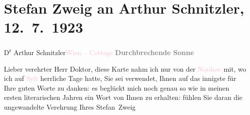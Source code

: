 

\renewcommand{\erwaehntePersonen}{Personen: Stefan Zweig}
\renewcommand{\erwaehnteOrte}{Orte: Nordsee, Salzburg, Sternwartestraße 71, Sylt, Wien, Währinger Cottage}
\renewcommand{\erwaehnteWerke}{}
\section[Stefan Zweig an Arthur Schnitzler, 12. 7. 1923]{Stefan Zweig an Arthur Schnitzler, 12. 7. 1923}
\nopagebreak{}
\rehead{ }\normalsize\beginnumbering{}
\toendnotes[C]{\smallbreak\pagebreak[2]}
\toendnotes[C]{\smallbreak}\pstart{}{\pb}D\textsuperscript{r}
                  Arthur Schnitzler\pend{}\pstart{}\textcolor{pink}{Wien – Cottage}{}\ledrightnote{\textcolor{pink}{Währinger Cottage}}\pend{}\pstart{}\textcolor{pink}{\label{K_L03666-1v}\label{K_L03666-1h}}{}\ledrightnote{\textcolor{pink}{Sternwartestraße 71}}\pend{}
{\bigskip}
\pstart
           \noindent{}\centering{}{\pb}\textcolor{gray}{\textbf{Durchbrechende Sonne}}\pend
           
\pstart
           \noindent{}{\pb}Lieber verehrter Herr
                  Doktor, diese Karte nahm ich nur von der \textcolor{pink}{Nordsee}{}\ledrightnote{\textcolor{pink}{Nordsee}} mit, wo ich auf \textcolor{pink}{Sylt}{}\ledrightnote{\textcolor{pink}{Sylt}} herrliche Tage
               hatte, Sie sei verwendet, Ihnen auf das innigste für Ihre guten Worte zu danken: es
               beglückt mich noch genau so wie in meinen ersten literarischen Jahren ein Wort von
               Ihnen zu erhalten: fühlen Sie daran die ungewandelte Verehrung Ihres \pend
           \pstart \spacefill\mbox{Stefan Zweig}\pend{}\endnumbering{}
\begin{anhang}
\end{anhang}
      